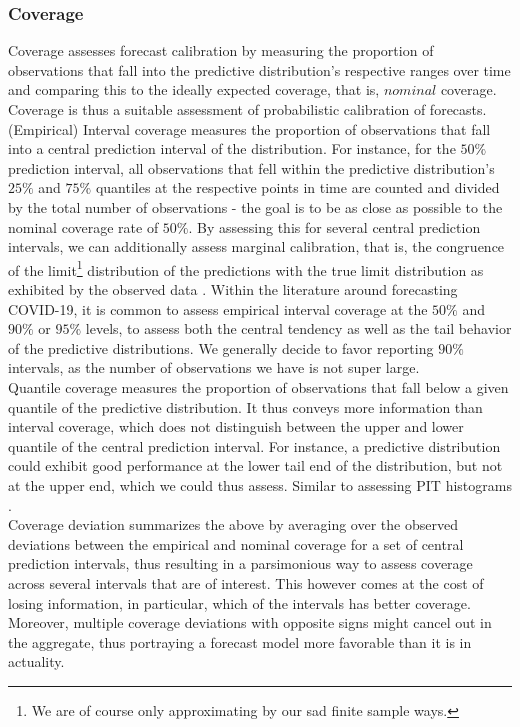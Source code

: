 \subsubsection{Coverage}
Coverage assesses forecast calibration by measuring the proportion of observations that fall into the predictive distribution's respective ranges over time and comparing this to the ideally expected coverage, that is, $nominal$ coverage. Coverage is thus a suitable assessment of probabilistic calibration of forecasts. \medskip\\
(Empirical) Interval coverage measures the proportion of observations that fall into a central prediction interval of the distribution. For instance, for the $50\%$ prediction interval, all observations that fell within the predictive distribution's $25\%$ and $75\%$ quantiles at the respective points in time are counted and divided by the total number of observations - the goal is to be as close as possible to the nominal coverage rate of $50\%$. By assessing this for several central prediction intervals, we can additionally assess marginal calibration, that is, the congruence of the limit\footnote{We are of course only approximating by our sad finite sample ways.} distribution of the predictions with the true limit distribution as exhibited by the observed data \cite{gneiting_probabilistic_2007}. Within the literature around forecasting COVID-19, it is common to assess empirical interval coverage at the $50\%$ and $90\%$ or $95\%$ levels, to assess both the central tendency as well as the tail behavior of the predictive distributions. We generally decide to favor reporting $90\%$ intervals, as the number of observations we have is not super large. \medskip\\
Quantile coverage measures the proportion of observations that fall below a given quantile of the predictive distribution. It thus conveys more information than interval coverage, which does not distinguish between the upper and lower quantile of the central prediction interval. For instance, a predictive distribution could exhibit good performance at the lower tail end of the distribution, but not at the upper end, which we could thus assess. Similar to assessing PIT histograms \cite{bosse_evaluating_2022}. \medskip \\
Coverage deviation summarizes the above by averaging over the observed deviations between the empirical and nominal coverage for a set of central prediction intervals, thus resulting in a parsimonious way to assess coverage across several intervals that are of interest. This however comes at the cost of losing information, in particular, which of the intervals has better coverage. Moreover, multiple coverage deviations with opposite signs might cancel out in the aggregate, thus portraying a forecast model more favorable than it is in actuality.   
